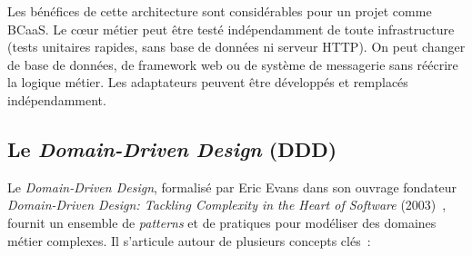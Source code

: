 Les bénéfices de cette architecture sont considérables pour un projet comme BCaaS. Le
c\oe{}ur métier peut être testé indépendamment de toute infrastructure (tests unitaires
rapides, sans base de données ni serveur HTTP). On peut changer de base de données, de
framework web ou de système de messagerie sans réécrire la logique métier. Les adaptateurs
peuvent être développés et remplacés indépendamment.

\subsection{Le \textit{Domain-Driven Design} (DDD)}
\label{subsec:ddd}

Le \textit{Domain-Driven Design}, formalisé par Eric Evans dans son ouvrage fondateur
\textit{Domain-Driven Design: Tackling Complexity in the Heart of Software}
(2003)~\cite{evans2003}, fournit un ensemble de \textit{patterns} et de pratiques pour
modéliser des domaines métier complexes. Il s'articule autour de plusieurs concepts
clés~:

